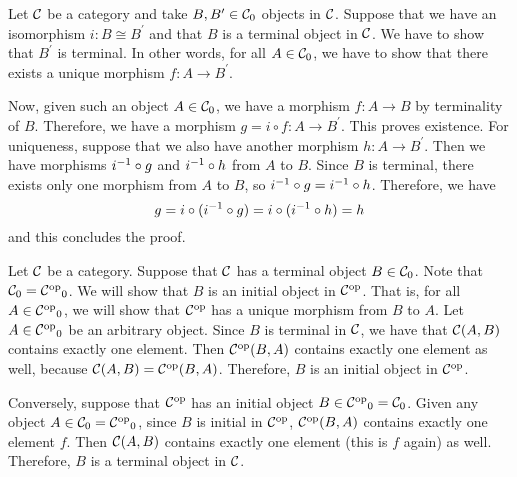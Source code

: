 \begin{solution}\label{sol:terminality_preserved_by_iso}
	Let $ \mathcal{C} $ be a category and take $ B, B^\prime \in {\mathcal{C}}_0 $ objects in $ \mathcal{C} $. Suppose that we have an isomorphism $ i: B \cong B^\prime $ and that $ B $ is a terminal object in $ \mathcal{C} $. We have to show that $ B^\prime $ is terminal. In other words, for all $ A \in {\mathcal{C}}_0 $, we have to show that there exists a unique morphism $ f: A \to B^\prime $.

	Now, given such an object $ A \in {\mathcal{C}}_0 $, we have a morphism $ f: A \to B $ by terminality of $ B $. Therefore, we have a morphism $ g = i \circ f: A \to B^\prime $. This proves existence. For uniqueness, suppose that we also have another morphism $ h: A \to B^\prime $. Then we have morphisms $ i ^{-1} \circ g $ and $ i ^{-1} \circ h $ from $ A $ to $ B $. Since $ B $ is terminal, there exists only one morphism from $ A $ to $ B $, so $ i ^{-1} \circ g = i ^{-1} \circ h $. Therefore, we have 
	\[ g = i \circ (i ^{-1} \circ g) = i \circ (i ^{-1} \circ h) = h \]
	and this concludes the proof.
\end{solution}

\begin{solution}\label{sol:terminal_iff_initial_op}
  Let $ \mathcal{C} $ be a category. Suppose that $ \mathcal{C} $ has a terminal object $ B \in {\mathcal{C}}_0 $. Note that $ {\mathcal{C}}_0 = {{\mathcal{C}}^\text{op}}_0 $. We will show that $ B $ is an initial object in $ {\mathcal{C}}^\text{op} $. That is, for all $ A \in {\ensuremath{{\mathcal{C}}^\text{op}}}_0 $, we will show that $ {\mathcal{C}}^\text{op} $ has a unique morphism from $ B $ to $ A $.
  Let $ A \in {\ensuremath{{\mathcal{C}}^\text{op}}}_0 $ be an arbitrary object. Since $ B $ is terminal in $ \mathcal{C} $, we have that $ \mathcal{C}(A, B) $ contains exactly one element. Then $ {\mathcal{C}}^\text{op}(B, A) $ contains exactly one element as well, because $ \mathcal{C}(A, B) = {\mathcal{C}}^\text{op}(B, A) $. Therefore, $ B $ is an initial object in $ {\mathcal{C}}^\text{op} $.
  
  Conversely, suppose that $ {\mathcal{C}}^\text{op} $ has an initial object $ B \in {\ensuremath{{\mathcal{C}}^\text{op}}}_0 = {\mathcal{C}}_0 $. Given any object $ A \in {\mathcal{C}}_0 = {{\mathcal{C}}^\text{op}}_0  $, since $ B $ is initial in $ {\mathcal{C}}^\text{op} $, $ {\mathcal{C}}^\text{op}(B, A) $ contains exactly one element $ f $. Then $ \mathcal{C}(A, B) $ contains exactly one element (this is $ f $ again) as well. Therefore, $ B $ is a terminal object in $ \mathcal{C} $.
\end{solution}

